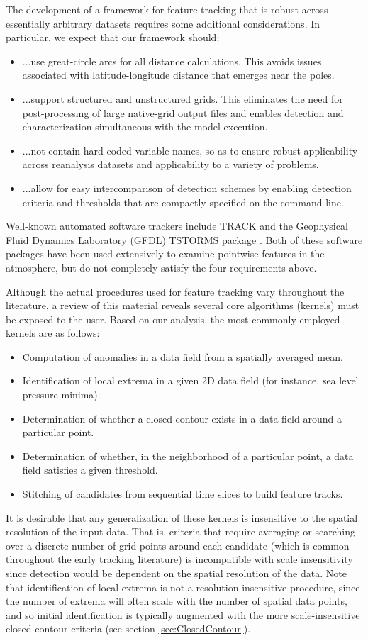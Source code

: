 \documentclass[gmdd, hvmath, online]{copernicus_discussions}
\begin{document}
The development of a framework for feature tracking that is robust across essentially arbitrary datasets requires some additional considerations.  In particular, we expect that our framework should:
\begin{itemize}
\item[] ...use great-circle arcs for all distance calculations.  This avoids issues associated with latitude-longitude distance that emerges near the poles.
\item[] ...support structured and unstructured grids.  This eliminates the need for post-processing of large native-grid output files and enables detection and characterization simultaneous with the model execution.
\item[] ...not contain hard-coded variable names, so as to ensure robust applicability across reanalysis datasets and applicability to a variety of problems.
\item[] ...allow for easy intercomparison of detection schemes by enabling detection criteria and thresholds that are compactly specified on the command line.
\end{itemize}  Well-known automated software trackers include TRACK \citep{hodges2015track} and the Geophysical Fluid Dynamics Laboratory (GFDL) TSTORMS package \citep{vitart1997simulation}.  Both of these software packages have been used extensively to examine pointwise features in the atmosphere, but do not completely satisfy the four requirements above.

Although the actual procedures used for feature tracking vary throughout the literature, a review of this material reveals several core algorithms (kernels) must be exposed to the user.  Based on our analysis, the most commonly employed kernels are as follows:
\begin{itemize}
\item Computation of anomalies in a data field from a spatially averaged mean.
\item Identification of local extrema in a given 2D data field (for instance, sea level pressure minima).
\item Determination of whether a closed contour exists in a data field around a particular point.
\item Determination of whether, in the neighborhood of a particular point, a data field satisfies a given threshold.
\item Stitching of candidates from sequential time slices to build feature tracks.
\end{itemize}  It is desirable that any generalization of these kernels is insensitive to the spatial resolution of the input data. That is, criteria that require averaging or searching over a discrete number of grid points around each candidate (which is common throughout the early tracking literature) is incompatible with scale insensitivity since detection would be dependent on the spatial resolution of the data. Note that identification of local extrema is not a resolution-insensitive procedure, since the number of extrema will often scale with the number of spatial data points, and so initial identification is typically augmented with the more scale-insensitive closed contour criteria (see section \ref{sec:ClosedContour}).
\end{document}
